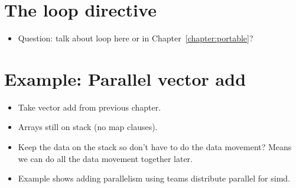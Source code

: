 \section{The loop directive}
\begin{itemize}
  \item Question: talk about loop here or in Chapter~\ref{chapter:portable}?
\end{itemize}

\section{Example: Parallel vector add}
\begin{itemize}
  \item Take vector add from previous chapter.
  \item Arrays still on stack (no map clauses).
  \item Keep the data on the stack so don’t have to do the data movement? Means we can do all the data movement together later.
  \item Example shows adding parallelism using teams distribute parallel for simd.
\end{itemize}

